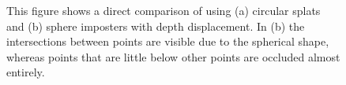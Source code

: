 \begin{figure}
\centering
{}
  
\caption{This figure shows a direct comparison of using (a) circular splats and (b) sphere imposters with depth displacement. In (b) the intersections between points are visible due to the spherical shape, whereas points that are little below other points are occluded almost entirely.}
\label{fig:point_sprites}
\end{figure}